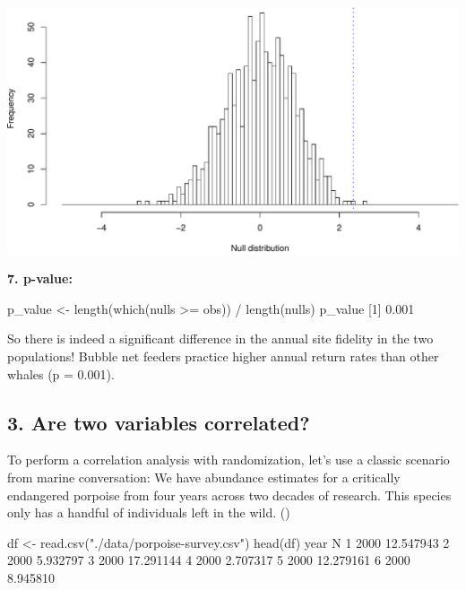 \documentclass[
]{book}
\newenvironment{Shaded}{\begin{snugshade}}{\end{snugshade}}
\newcommand{\DecValTok}[1]{\textcolor[rgb]{0.00,0.00,0.81}{#1}}
\newcommand{\FloatTok}[1]{\textcolor[rgb]{0.00,0.00,0.81}{#1}}
\newcommand{\FunctionTok}[1]{\textcolor[rgb]{0.00,0.00,0.00}{#1}}
\newcommand{\NormalTok}[1]{#1}
\newcommand{\OtherTok}[1]{\textcolor[rgb]{0.56,0.35,0.01}{#1}}
\newcommand{\SpecialCharTok}[1]{\textcolor[rgb]{0.00,0.00,0.00}{#1}}
\newcommand{\StringTok}[1]{\textcolor[rgb]{0.31,0.60,0.02}{#1}}
\begin{document}
\includegraphics{figures/unnamed-chunk-464-1.pdf}

\textbf{7. p-value:}

\begin{Shaded}
\begin{Highlighting}[]
\NormalTok{p\_value }\OtherTok{\textless{}{-}} \FunctionTok{length}\NormalTok{(}\FunctionTok{which}\NormalTok{(nulls }\SpecialCharTok{\textgreater{}=}\NormalTok{ obs)) }\SpecialCharTok{/} \FunctionTok{length}\NormalTok{(nulls)}
\NormalTok{p\_value}
\NormalTok{[}\DecValTok{1}\NormalTok{] }\FloatTok{0.001}
\end{Highlighting}
\end{Shaded}

So there is indeed a significant difference in the annual site fidelity in the two populations! Bubble net feeders practice higher annual return rates than other whales (p = 0.001).

\hypertarget{are-two-variables-correlated}{%
\subsection*{3. Are two variables correlated?}\label{are-two-variables-correlated}}

To perform a correlation analysis with randomization, let's use a classic scenario from marine conversation: We have abundance estimates for a critically endangered porpoise from four years across two decades of research. This species only has a handful of individuals left in the wild. ()

\begin{Shaded}
\begin{Highlighting}[]
\NormalTok{df }\OtherTok{\textless{}{-}} \FunctionTok{read.csv}\NormalTok{(}\StringTok{"./data/porpoise{-}survey.csv"}\NormalTok{)}
\FunctionTok{head}\NormalTok{(df)}
\NormalTok{  year         N}
\DecValTok{1} \DecValTok{2000} \FloatTok{12.547943}
\DecValTok{2} \DecValTok{2000}  \FloatTok{5.932797}
\DecValTok{3} \DecValTok{2000} \FloatTok{17.291144}
\DecValTok{4} \DecValTok{2000}  \FloatTok{2.707317}
\DecValTok{5} \DecValTok{2000} \FloatTok{12.279161}
\DecValTok{6} \DecValTok{2000}  \FloatTok{8.945810}
\end{Highlighting}
\end{Shaded}
\end{document}
